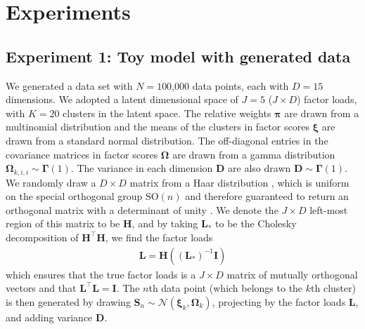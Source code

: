 \documentclass[twocolumn]{aastex62}
\newcommand{\vect}[1]{\boldsymbol{\mathbf{#1}}}
\renewcommand{\vec}[1]{\vect{#1}}
\newcommand{\weight}{\pi}
\newcommand{\transpose}{^\intercal}
\newcommand{\eye}{\textbf{I}}
\newcommand{\factorloads}{\textbf{L}}
\newcommand{\factorscores}{\textbf{S}}
\newcommand{\specificvariance}{\vec{D}}
\newcommand{\scoremeans}{\vec\xi}
\newcommand{\scorecovs}{\vec\Omega}
\newcommand{\NumData}{N}
\newcommand{\NumDimensions}{D}
\newcommand{\numdata}{n}
\newcommand{\NumLatentFactors}{J}
\newcommand{\NumComponents}{K}
\newcommand{\numcomponents}{k}
\begin{document}

\section{Experiments} \label{sec:experiments}




\subsection{Experiment 1: Toy model with generated data} \label{sec:exp-1}




We generated a data set with ${\NumData = 1}$00,000 data points, each with
$\NumDimensions = 15$ dimensions. We adopted a latent dimensional space of 
$\NumLatentFactors = 5$ ($\NumLatentFactors \times \NumDimensions$) factor loads, 
with $\NumComponents = 20$ clusters in the latent space. The relative weights $\vec\weight$
are drawn from a multinomial distribution and the means of the clusters
in factor scores $\scoremeans$ are drawn from a standard normal
distribution. The off-diagonal entries in the covariance matrices in factor scores $\scorecovs$ are drawn from a gamma distribution $\scorecovs_{\numcomponents,i,i} \sim \vec\Gamma\left(1\right)$. The variance in 
each dimension $\specificvariance$ are also drawn $\specificvariance \sim \vec\Gamma\left(1\right)$.
We randomly draw a  $\NumDimensions \times \NumDimensions$ matrix from a Haar distribution \citep{Haar:1933},
which is uniform on the special orthogonal group $\textrm{SO}(n)$ and therefore guaranteed to return an orthogonal
matrix with a determinant of unity \citep{Stewart:1980}.
We denote the $\NumLatentFactors \times \NumDimensions$ left-most region of this
matrix to be $\mathbf{H}$, and by taking $\factorloads_\ast$ to be the Cholesky decomposition of $\mathbf{H}\transpose \mathbf{H}$, we find the factor loads
\begin{eqnarray}
 	\factorloads = \mathbf{H}\left(\left(\factorloads_\ast\right)^{-1}\eye\right)
\end{eqnarray}
\noindent{}which ensures that the true factor loads is a $\NumLatentFactors \times \NumDimensions$
matrix of mutually orthogonal vectors and that $\factorloads\transpose \factorloads = \eye$.
The $\numdata$th data point (which belongs to the $\numcomponents$th cluster) is then
generated by drawing $\factorscores_{\numdata} \sim \mathcal{N}(\scoremeans_\numcomponents,\scorecovs_\numcomponents)$, projecting by the factor loads $\factorloads$, and adding variance $\specificvariance$.
\end{document}
